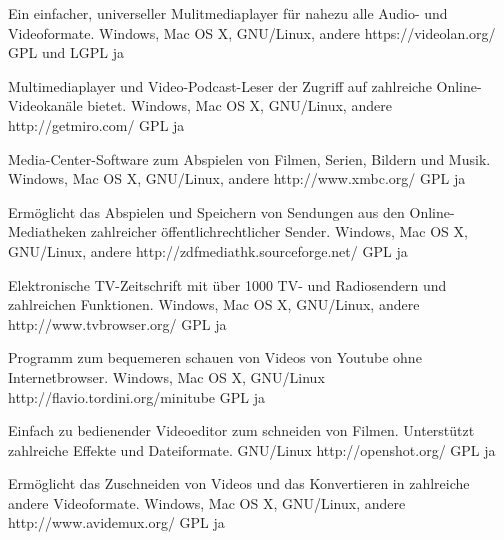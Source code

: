 




{Ein einfacher, universeller Mulitmediaplayer für nahezu alle Audio- und Videoformate.}
{Windows, Mac OS X, GNU/Linux, andere}
{https://videolan.org/}
{GPL und LGPL}
{ja}

{Multimediaplayer und Video-Podcast-Leser der Zugriff auf zahlreiche Online-Videokanäle bietet.}
{Windows, Mac OS X, GNU/Linux, andere}
{http://getmiro.com/}
{GPL}
{ja}

{Media-Center-Software zum Abspielen von Filmen, Serien, Bildern und Musik.}
{Windows, Mac OS X, GNU/Linux, andere}
{http://www.xmbc.org/}
{GPL}
{ja}

{Ermöglicht das Abspielen und Speichern von Sendungen aus den Online-Mediatheken zahlreicher öffentlichrechtlicher Sender.}
{Windows, Mac OS X, GNU/Linux, andere}
{http://zdfmediathk.sourceforge.net/}
{GPL}
{ja}


{Elektronische TV-Zeitschrift mit über 1000 TV- und Radiosendern und zahlreichen Funktionen.}
{Windows, Mac OS X, GNU/Linux, andere}
{http://www.tvbrowser.org/}
{GPL}
{ja}

{Programm zum bequemeren schauen von Videos von Youtube ohne Internetbrowser.}
{Windows, Mac OS X, GNU/Linux}
{http://flavio.tordini.org/minitube}
{GPL}
{ja}

{Einfach zu bedienender Videoeditor zum schneiden von Filmen. Unterstützt zahlreiche Effekte und Dateiformate.}
{GNU/Linux}
{http://openshot.org/}
{GPL}
{ja}

{Ermöglicht das Zuschneiden von Videos und das Konvertieren in zahlreiche andere Videoformate.}
{Windows, Mac OS X, GNU/Linux, andere}
{http://www.avidemux.org/}
{GPL}
{ja}

\backpage


